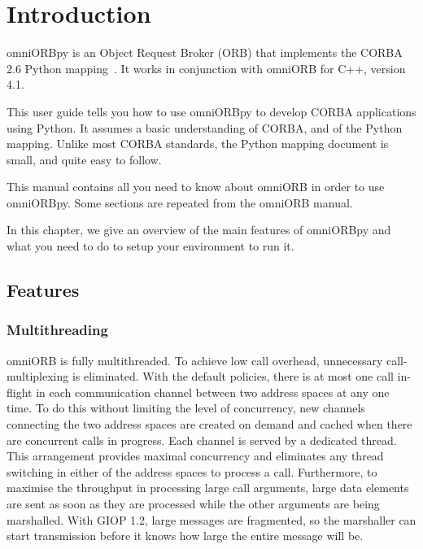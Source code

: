 \documentclass[draft,11pt,twoside,a4paper]{book}
\begin{document}

\mainmatter

\chapter{Introduction}

omniORBpy is an Object Request Broker (ORB) that implements the CORBA
2.6 Python mapping~\cite{pythonmapping}. It works in conjunction with
omniORB for C++, version 4.1.

This user guide tells you how to use omniORBpy to develop CORBA
applications using Python. It assumes a basic understanding of CORBA,
and of the Python mapping. Unlike most CORBA standards, the Python
mapping document is small, and quite easy to follow.

This manual contains all you need to know about omniORB in order to
use omniORBpy. Some sections are repeated from the omniORB manual.

In this chapter, we give an overview of the main features of omniORBpy
and what you need to do to setup your environment to run it.

\section{Features}

\subsection{Multithreading}

omniORB is fully multithreaded. To achieve low call overhead,
unnecessary call-multiplexing is eliminated. With the default
policies, there is at most one call in-flight in each communication
channel between two address spaces at any one time. To do this without
limiting the level of concurrency, new channels connecting the two
address spaces are created on demand and cached when there are
concurrent calls in progress. Each channel is served by a dedicated
thread. This arrangement provides maximal concurrency and eliminates
any thread switching in either of the address spaces to process a
call. Furthermore, to maximise the throughput in processing large call
arguments, large data elements are sent as soon as they are processed
while the other arguments are being marshalled. With GIOP 1.2, large
messages are fragmented, so the marshaller can start transmission
before it knows how large the entire message will be.
\end{document}
